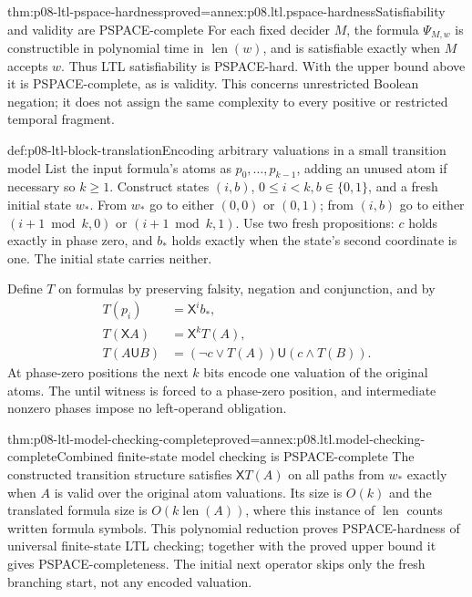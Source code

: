 \begin{hbtheorem}{thm:p08-ltl-pspace-hardness}{proved=annex:p08.ltl.pspace-hardness}{Satisfiability and validity are PSPACE-complete}
For each fixed decider \(M\), the formula \(\Psi_{M,w}\)
is constructible in polynomial time in \(\operatorname{len}(w)\), and is
satisfiable exactly when \(M\) accepts \(w\). Thus LTL
satisfiability is PSPACE-hard. With the upper bound above it
is PSPACE-complete, as is validity. This concerns unrestricted
Boolean negation; it does not assign the same complexity to
every positive or restricted temporal fragment.
\cite[Section 4, especially Lemma 4.4]{SistlaClarke1985}
\end{hbtheorem}

\begin{hbdefinition}{def:p08-ltl-block-translation}{Encoding arbitrary valuations in a small transition model}
List the input formula's atoms as \(p_0,\ldots,p_{k-1}\),
adding an unused atom if necessary so \(k\geq1\).
Construct states \((i,b)\), \(0\leq i<k,b\in\{0,1\}\),
and a fresh initial state \(w_*\). From \(w_*\) go to
either \((0,0)\) or \((0,1)\); from \((i,b)\) go to
either \((i+1\bmod k,0)\) or \((i+1\bmod k,1)\).
Use two fresh propositions: \(c\) holds exactly in phase zero,
and \(b_*\) holds exactly when the state's second coordinate
is one. The initial state carries neither.

Define \(T\) on formulas by preserving falsity, negation and
conjunction, and by
\[
\begin{aligned}
 T(p_i)&=\mathsf X^i b_*,\\
 T(\mathsf XA)&=\mathsf X^kT(A),\\
 T(A\mathbin{\mathsf U}B)
   &=(\neg c\lor T(A))\mathbin{\mathsf U}(c\land T(B)).
\end{aligned}
\]
At phase-zero positions the next \(k\) bits encode one valuation
of the original atoms. The until witness is forced to a phase-zero
position, and intermediate nonzero phases impose no left-operand
obligation.
\end{hbdefinition}

\begin{hbtheorem}{thm:p08-ltl-model-checking-complete}{proved=annex:p08.ltl.model-checking-complete}{Combined finite-state model checking is PSPACE-complete}
The constructed transition structure satisfies
\(\mathsf XT(A)\) on all paths from \(w_*\) exactly when
\(A\) is valid over the original atom valuations. Its size is
\(O(k)\) and the translated formula size is
\(O(k\operatorname{len}(A))\), where this instance of
\(\operatorname{len}\) counts written formula symbols.
This polynomial reduction proves PSPACE-hardness of universal
finite-state LTL checking; together with the proved upper bound
it gives PSPACE-completeness. The initial next operator skips
only the fresh branching start, not any encoded valuation.
\end{hbtheorem}

